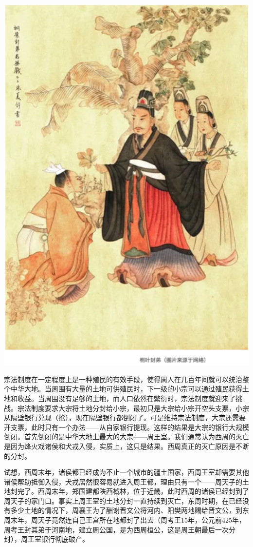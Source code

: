 \documentclass[
]{book}
\begin{document}
\includegraphics[width=5.67in]{images/gx3}

宗法制度在一定程度上是一种殖民的有效手段，使得周人在几百年间就可以统治整个中华大地。当周围有大量的土地可供殖民时，下一级的小宗可以通过殖民获得土地和收益。当周围没有足够的土地，而人口依然在繁衍时，宗法制度就迎来了挑战。宗法制度要求大宗将土地分封给小宗，最初只是大宗给小宗开空头支票，小宗从隔壁银行兑现（抢），现在隔壁银行都倒闭了。可是维持宗法制度，大宗还需要开支票，此时只有一个办法------从自家银行提现。这样的结果是大宗的银行大规模倒闭。首先倒闭的是中华大地上最大的大宗------周王室。我们通常认为西周的灭亡是因为烽火戏诸侯和犬戎入侵，实质上，这只是结果。西周真正的灭亡原因是不断的分封。

试想，西周末年，诸侯都已经成为不止一个城市的疆土国家，西周王室却需要其他诸侯帮助抵御入侵，犬戎居然很容易就进入周王都，理由只有一个------周天子的土地封完了。西周末年，郑国建都陕西棫林，位于近畿，此时西周的诸侯已经封到了周天子的家门口。事实上周王室的土地分封一直持续到灭亡，东周时期，在已经没有多少土地的情况下，周襄王为了酬谢晋文公将河内、阳樊两地赐给晋文公，到东周末年，周天子竟然连自己王宫所在地都封了出去（周考王15年，公元前425年，周考王封其弟于河南地，建立周公国，是为西周桓公，这是周王朝最后一次分封），周王室银行彻底破产。
\end{document}

